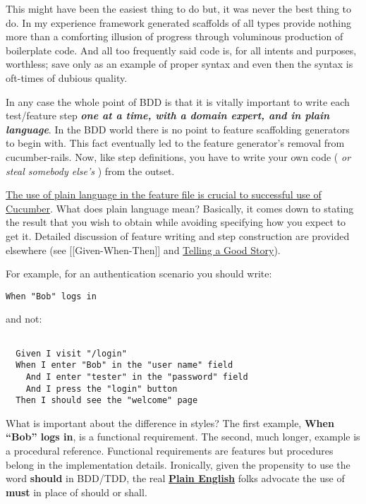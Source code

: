 This might have been the easiest thing to do but, it was never the best thing to do.  In my experience framework generated scaffolds of all types provide nothing more than a comforting illusion of progress through voluminous production of boilerplate code.  And all too frequently said code is, for all intents and purposes, worthless; save only as an example of proper syntax and even then the syntax is oft-times of dubious quality.

In any case the whole point of BDD is that it is vitally important to write each test/feature step \emph{\textbf{one at a time, with a domain expert, and in plain language}}.  In the BDD world there is no point to feature scaffolding generators to begin with.  This fact eventually led to the feature generator's removal from cucumber-rails.  Now, like step definitions, you have to write your own code ( \emph{or steal somebody else's} ) from the outset.

\href{http://elabs.se/blog/15-you-re-cuking-it-wrong}{The use of plain language in the feature file is crucial to successful use of Cucumber}.  What does plain language mean?  Basically, it comes down to stating the result that you wish to obtain while avoiding specifying how you expect to get it.  Detailed discussion of feature writing and step construction are provided elsewhere (see [[Given-When-Then]] and \href{http://blog.josephwilk.net/ruby/telling-a-good-story-rspec-stories-from-the-trenches.html}{Telling a Good Story}).

For example, for an authentication scenario you should write:

\begin{verbatim}
When "Bob" logs in
\end{verbatim}
and not:

\begin{verbatim}

  Given I visit "/login"
  When I enter "Bob" in the "user name" field
    And I enter "tester" in the "password" field
    And I press the "login" button
  Then I should see the "welcome" page

\end{verbatim}


What is important about the difference in styles?  The first example, \textbf{When ``Bob'' logs in},  is a functional requirement.  The second, much longer, example is a procedural reference.  Functional requirements are features but procedures belong in the implementation details.  Ironically, given the propensity to use the word \textbf{should} in BDD/TDD, the real \textbf{\href{http://www.plainlanguage.gov/whatisPL/definitions/Kimble.cfm}{Plain English}} folks advocate the use of \textbf{must} in place of should or shall.

